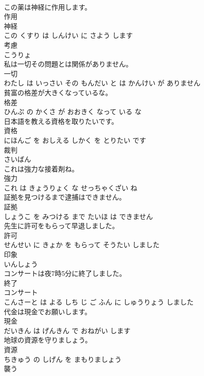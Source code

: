 \documentclass[8pt]{extreport}
\begin{document}
\begin{CJK}{UTF8}{min}
\\	この薬は神経に作用します。	
\\	作用 
\\	神経 
\\	この くすり は しんけい に さよう します			
\\	考慮	
\\	こうりょ			
\\	私は一切その問題とは関係がありません。	
\\	一切 
\\	わたし は いっさい その もんだい と は かんけい が ありません			
\\	貧富の格差が大きくなっているな。	
\\	格差 
\\	ひんぷ の かくさ が おおきく なって いる な			
\\	日本語を教える資格を取りたいです。	
\\	資格 
\\	にほんご を おしえる しかく を とりたい です			
\\	裁判	
\\	さいばん			
\\	これは強力な接着剤ね。	
\\	強力 
\\	これ は きょうりょく な せっちゃくざい ね			
\\	証拠を見つけるまで逮捕はできません。	
\\	証拠 
\\	しょうこ を みつける まで たいほ は できません			
\\	先生に許可をもらって早退しました。	
\\	許可 
\\	せんせい に きょか を もらって そうたい しました			
\\	印象	
\\	いんしょう			
\\	コンサートは夜7時5分に終了しました。	
\\	終了 
\\	コンサート 
\\	こんさーと は よる しち じ ご ふん に しゅうりょう しました			
\\	代金は現金でお願いします。	
\\	現金 
\\	だいきん は げんきん で おねがい します			
\\	地球の資源を守りましょう。	
\\	資源 
\\	ちきゅう の しげん を まもりましょう			
\\	襲う	

\end{CJK}
\end{document}
